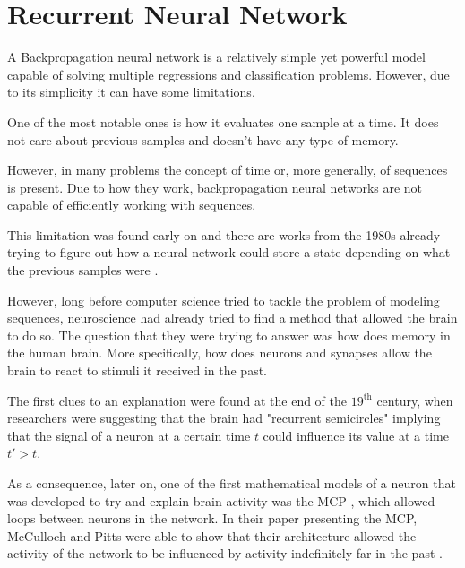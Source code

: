 

\section{Recurrent Neural Network}\label{sec:RecurrentNeuralNetwork}

A Backpropagation neural network is a relatively simple yet powerful model capable of solving multiple regressions and classification problems.
However, due to its simplicity it can have some limitations.

One of the most notable ones is how it evaluates one sample at a time.
It does not care about previous samples and doesn't have any type of memory.

However, in many problems the concept of time or, more generally, of sequences is present.
Due to how they work, backpropagation neural networks are not capable of efficiently working with sequences.

This limitation was found early on and there are works from the 1980s already trying to figure out how a neural network could store a state depending on what the previous samples were \cite{jordan1986serial}.

However, long before computer science tried to tackle the problem of modeling sequences, neuroscience had already tried to find a method that allowed the brain to do so.
The question that they were trying to answer was how does memory in the human brain.
More specifically, how does neurons and synapses allow the brain to react to stimuli it received in the past.

The first clues to an explanation were found at the end of the $19^{\text{th}}$ century, when researchers were suggesting that the brain had "recurrent semicircles" \cite{espinosa2025importance} implying that the signal of a neuron at a certain time $t$ could influence its value at a time $t' > t$.

As a consequence, later on, one of the first mathematical models of a neuron that was developed to try and explain brain activity was the MCP \cite{mcculloch1943logical}, which allowed loops between neurons in the network.
In their paper presenting the MCP, McCulloch and Pitts were able to show that their architecture allowed the activity of the network to be influenced by activity indefinitely far in the past \cite{mcculloch1943logical}.

